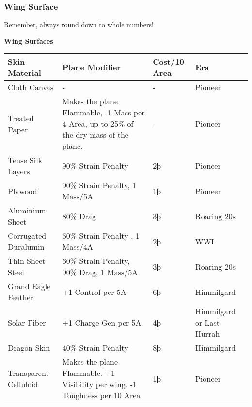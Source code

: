 \documentclass{article}
\begin{document}
\subsubsection{Wing Surface}
\label{_Wing Surface}

Remember, always round down to whole numbers!

\textbf{Wing Surfaces}

\begin{tabular}{|l|l|l|l|}
    \hline
    Skin Material                      & Plane Modifier                                       & Cost/10 Area & Era                       \\\hline
    Cloth Canvas                       & -                                                    & -            & Pioneer                   \\\hline
    Treated Paper                      & Makes the plane Flammable, -1 Mass per 4 Area, up to
    25\% of the dry mass of the plane. & -                                                    & Pioneer                                  \\\hline
    Tense Silk Layers                  & 90\% Strain Penalty                                  & 2þ           & Pioneer                   \\\hline
    Plywood                            & 90\% Strain Penalty, 1 Mass/5A                       & 1þ           & Pioneer                   \\\hline
    Aluminium Sheet                    & 80\% Drag                                            & 3þ           & Roaring 20s               \\\hline
    Corrugated Duralumin               & 60\% Strain Penalty , 1 Mass/4A                      & 2þ           & WWI                       \\\hline
    Thin Sheet Steel                   & 60\% Strain Penalty, 90\% Drag, 1 Mass/5A            & 3þ           &
    Roaring 20s                                                                                                                          \\\hline
    Grand Eagle Feather                & +1 Control per 5A                                    & 6þ           & Himmilgard                \\\hline
    Solar Fiber                        & +1 Charge Gen per 5A                                 & 4þ           & Himmilgard or Last Hurrah \\\hline
    Dragon Skin                        & 40\% Strain Penalty                                  & 8þ           & Himmilgard                \\\hline
    Transparent Celluloid              & Makes the plane Flammable. +1 Visibility per
    wing. -1 Toughness per 10 Area     & 1þ                                                   & Pioneer                                  \\\hline
\end{tabular}
\end{document}
